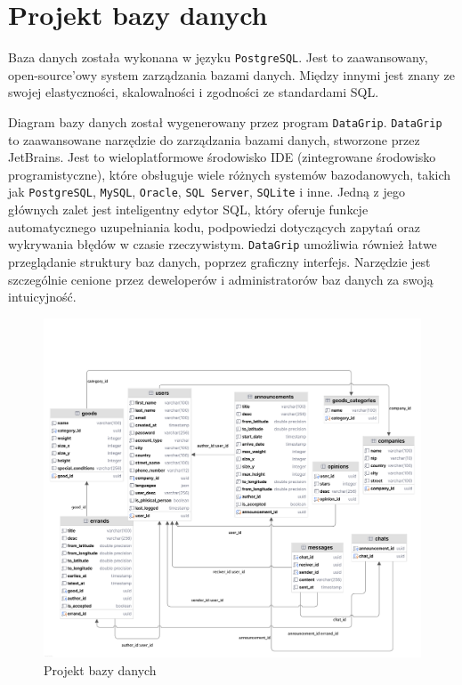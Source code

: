 \section{Projekt bazy danych}
Baza danych została wykonana w języku \texttt{PostgreSQL}. Jest to zaawansowany, open-source'owy system zarządzania bazami danych. Między innymi jest znany ze swojej elastyczności, skalowalności i zgodności ze standardami SQL.

Diagram bazy danych został wygenerowany przez program \texttt{DataGrip}. \texttt{DataGrip} to zaawansowane narzędzie do zarządzania bazami danych, stworzone przez JetBrains. Jest to wieloplatformowe środowisko IDE (zintegrowane środowisko programistyczne), które obsługuje wiele różnych systemów bazodanowych, takich jak \texttt{PostgreSQL}, \texttt{MySQL}, \texttt{Oracle}, \texttt{SQL Server}, \texttt{SQLite} i inne. Jedną z jego głównych zalet jest inteligentny edytor SQL, który oferuje funkcje automatycznego uzupełniania kodu, podpowiedzi dotyczących zapytań oraz wykrywania błędów w czasie rzeczywistym. \texttt{DataGrip} umożliwia również łatwe przeglądanie struktury baz danych, poprzez graficzny interfejs. Narzędzie jest szczególnie cenione przez deweloperów i administratorów baz danych za swoją intuicyjność.

\begin{figure}[H]
	\centering
		\includegraphics[width=1\linewidth]{rozdzial1/baza_danych.png}
	\caption{Projekt bazy danych}
	\label{Rys. fig:Projekt bazy danych}
\end{figure}

